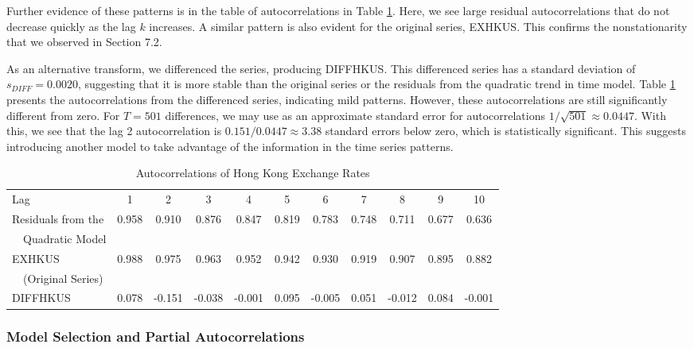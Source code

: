 Further evidence of these patterns is in the table of
autocorrelations in Table \ref{T8:HKRatesAuto}. Here, we see large
residual autocorrelations that do not decrease quickly as the lag
$k$ increases. A similar pattern is also evident for the original
series, EXHKUS. This confirms the nonstationarity that we observed
in Section 7.2.

As an alternative transform, we differenced the series, producing
DIFFHKUS. This differenced series has a standard deviation of
$s_{DIFF}=0.0020$, suggesting that it is more stable than the
original series or the residuals from the quadratic trend in time
model. Table \ref{T8:HKRatesAuto} presents the autocorrelations from
the differenced series, indicating mild patterns. However, these
autocorrelations are still significantly different from zero. For
$T=501$ differences, we may use as an approximate standard error for
autocorrelations $1/\sqrt{501}\approx 0.0447.$ With this, we see
that the lag 2 autocorrelation is $0.151/0.0447\approx 3.38$
standard errors below zero, which is statistically significant. This
suggests introducing another model to take advantage of the
information in the time series patterns.

\bigskip

\begin{table}[h]
 \caption{\label{T8:HKRatesAuto} Autocorrelations of
Hong Kong Exchange Rates}
\begin{center}
\begin{tabular}{l|cccccccccc}
\hline
Lag & 1 & 2 & 3 & 4 & 5 & 6 & 7 & 8 & 9 & 10 \\
Residuals from the & 0.958 & 0.910 & 0.876 & 0.847 & 0.819 & 0.783 & 0.748 &
0.711 & 0.677 & 0.636 \\
\ \ Quadratic Model &  &  &  &  &  &  &  &  &  &  \\
EXHKUS  & 0.988 & 0.975 & 0.963 & 0.952 & 0.942 & 0.930 & 0.919 &
0.907 & 0.895
& 0.882 \\
\ \ (Original Series) &  &  &  &  &  &  &  &  &  &  \\
DIFFHKUS & 0.078 & -0.151 & -0.038 & -0.001 & 0.095 & -0.005 & 0.051
& -0.012 & 0.084 & -0.001 \\ \hline
\end{tabular}\end{center}

\end{table}

\subsubsection*{Model Selection and Partial
Autocorrelations}

